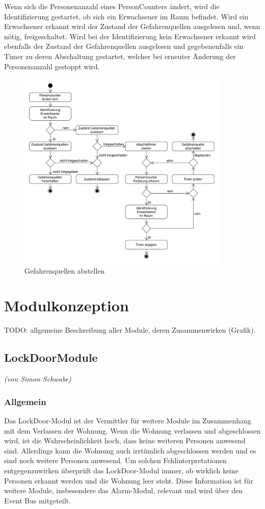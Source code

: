 Wenn sich die Personenanzahl eines PersonCounters ändert, wird die Identifizierung gestartet, ob sich ein Erwachsener im Raum befindet. Wird ein Erwachsener erkannt wird der Zustand der Gefahrenquellen ausgelesen und, wenn nötig, freigeschaltet. Wird bei der Identifizierung kein Erwachsener erkannt wird ebenfalls der Zustand der Gefahrenquellen ausgelesen und gegebenenfalls ein Timer zu deren Abschaltung gestartet, welcher bei erneuter Änderung der Personenanzahl gestoppt wird.

\begin{figure}[h!]
	\centering
	\includegraphics[width=0.9\textwidth]{img/Szenarien/GefahrenquellenAbstellen.pdf}
	\caption{Gefahrenquellen abstellen}
	\label{fig:szenarienGefahrenquellenAbstellen}
\end{figure}


\section{Modulkonzeption}
\label{sec:modulkonzepte}
TODO: allgemeine Beschreibung aller Module, deren Zusammenwirken (Grafik).

\subsection{LockDoorModule}
\emph{(von Simon Schwabe)}

\subsubsection{Allgemein}
Das LockDoor-Modul ist der Vermittler für weitere Module im Zusammenhang mit dem Verlassen der Wohnung. Wenn die Wohnung verlassen und abgeschlossen wird, ist die Wahrscheinlichkeit hoch, dass keine weiteren Personen anwesend sind. Allerdings kann die Wohnung auch irrtümlich abgeschlossen werden und es sind noch weitere Personen anwesend. Um solchen Fehlinterpretationen entgegenzuwirken überprüft das LockDoor-Modul immer, ob wirklich keine Personen erkannt werden und die Wohnung leer steht. Diese Information ist für weitere Module, insbesondere das Alarm-Modul, relevant und wird über den Event Bus mitgeteilt.

